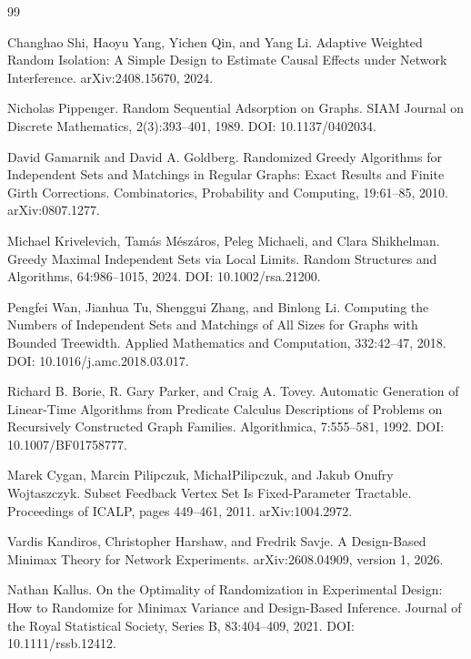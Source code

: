\documentclass{article}
\begin{document}
\begin{thebibliography}{99}

   Changhao Shi, Haoyu Yang, Yichen Qin, and Yang Li. Adaptive Weighted Random Isolation: A Simple Design to Estimate Causal Effects under Network Interference. arXiv:2408.15670, 2024.

   Nicholas Pippenger. Random Sequential Adsorption on Graphs. SIAM Journal on Discrete Mathematics, 2(3):393--401, 1989. DOI: 10.1137/0402034.

   David Gamarnik and David A. Goldberg. Randomized Greedy Algorithms for Independent Sets and Matchings in Regular Graphs: Exact Results and Finite Girth Corrections. Combinatorics, Probability and Computing, 19:61--85, 2010. arXiv:0807.1277.

   Michael Krivelevich, Tam\'as M\'esz\'aros, Peleg Michaeli, and Clara Shikhelman. Greedy Maximal Independent Sets via Local Limits. Random Structures and Algorithms, 64:986--1015, 2024. DOI: 10.1002/rsa.21200.

   Pengfei Wan, Jianhua Tu, Shenggui Zhang, and Binlong Li. Computing the Numbers of Independent Sets and Matchings of All Sizes for Graphs with Bounded Treewidth. Applied Mathematics and Computation, 332:42--47, 2018. DOI: 10.1016/j.amc.2018.03.017.

   Richard B. Borie, R. Gary Parker, and Craig A. Tovey. Automatic Generation of Linear-Time Algorithms from Predicate Calculus Descriptions of Problems on Recursively Constructed Graph Families. Algorithmica, 7:555--581, 1992. DOI: 10.1007/BF01758777.

   Marek Cygan, Marcin Pilipczuk, Micha\l Pilipczuk, and Jakub Onufry Wojtaszczyk. Subset Feedback Vertex Set Is Fixed-Parameter Tractable. Proceedings of ICALP, pages 449--461, 2011. arXiv:1004.2972.

   Vardis Kandiros, Christopher Harshaw, and Fredrik Savje. A Design-Based Minimax Theory for Network Experiments. arXiv:2608.04909, version 1, 2026.

   Nathan Kallus. On the Optimality of Randomization in Experimental Design: How to Randomize for Minimax Variance and Design-Based Inference. Journal of the Royal Statistical Society, Series B, 83:404--409, 2021. DOI: 10.1111/rssb.12412.


\end{thebibliography}
\end{document}
